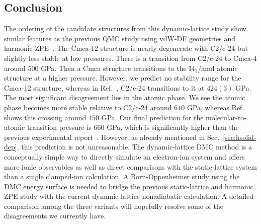\subsection{Conclusion}
The ordering of the candidate structures from this dynamic-lattice study show similar features as the previous QMC study using vdW-DF geometries and harmonic ZPE~\cite{McMinis2015}.
The Cmca-12 structure is nearly degenerate with C2/c-24 but slightly less stable at low pressures.
There is a transition from C2/c-24 to Cmca-4 around $500$ GPa.
Then a Cmca structure transitions to the I4$_1$/amd atomic structure at a higher pressure.
However, we predict no stability range for the Cmca-12 structure, whereas in Ref.~\cite{McMinis2015}, C2/c-24 transitions to it at $424(3)$ GPa.
The most significant disagreement lies in the atomic phase.
We see the atomic phase becomes more stable relative to C2/c-24 around $610$ GPa, whereas Ref.~\cite{McMinis2015} shows this crossing around $450$ GPa.
Our final prediction for the molecular-to-atomic transition pressure is $660$ GPa, which is significantly higher than the previous experimental report~\cite{Silvera2017}.
However, as already mentioned in Sec.~\ref{sec:hsolid-dep}, this prediction is not unreasonable.
The dynamic-lattice DMC method is a conceptually simple way to directly simulate an electron-ion system and offers more ionic observables as well as direct comparisons with the static-lattice system than a single clamped-ion calculation.
A Born-Oppenheimer study using the DMC energy surface is needed to bridge the previous static-lattice and harmonic ZPE study with the current dynamic-lattice nonadiabatic calculation.
A detailed comparison among the three variants will hopefully resolve some of the disagreements we currently have.

